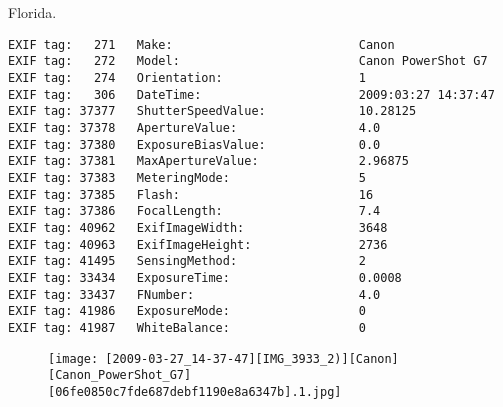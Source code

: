 \section{\protect{}}
\noindent Florida.
\noindent
\begin{lstlisting}
EXIF tag:   271   Make:                          Canon
EXIF tag:   272   Model:                         Canon PowerShot G7
EXIF tag:   274   Orientation:                   1
EXIF tag:   306   DateTime:                      2009:03:27 14:37:47
EXIF tag: 37377   ShutterSpeedValue:             10.28125
EXIF tag: 37378   ApertureValue:                 4.0
EXIF tag: 37380   ExposureBiasValue:             0.0
EXIF tag: 37381   MaxApertureValue:              2.96875
EXIF tag: 37383   MeteringMode:                  5
EXIF tag: 37385   Flash:                         16
EXIF tag: 37386   FocalLength:                   7.4
EXIF tag: 40962   ExifImageWidth:                3648
EXIF tag: 40963   ExifImageHeight:               2736
EXIF tag: 41495   SensingMethod:                 2
EXIF tag: 33434   ExposureTime:                  0.0008
EXIF tag: 33437   FNumber:                       4.0
EXIF tag: 41986   ExposureMode:                  0
EXIF tag: 41987   WhiteBalance:                  0

\end{lstlisting}
\clearpage
\begin{figure}
\raggedleft
\texttt{[image: [2009-03-27\_14-37-47][IMG\_3933\_2)][Canon][Canon\_PowerShot\_G7][06fe0850c7fde687debf1190e8a6347b].1.jpg]}
\end{figure}


\clearpage
